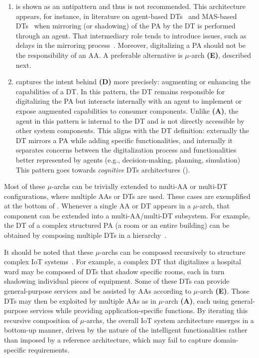 \begin{enumerate}[label=\textbf{(\Alph*)}]
    \item  is shown as an antipattern and thus is not recommended. 
    This architecture appears, for instance, in literature on agent-based DTs~\cite{Alelaimat_Ghose_Dam_2021,Stary_2021} and MAS-based DTs~\cite{Wan_David_Derigent_2021,Pretel_Zhinin-Vera_Navarro_López-Jaquero_González_2025} when mirroring (or shadowing) of the PA by the DT is performed through an agent. 
    That intermediary role tends to introduce issues, such as delays in the mirroring process~\cite{calvaresi2017challenge}. 
    Moreover, digitalizing a PA should not be the responsibility of an AA. 
    A preferable alternative is $\mu$-arch \textbf{(E)}, described next. 

    \item  captures the intent behind \textbf{(D)} more precisely: augmenting or enhancing the capabilities of a DT. 
    In this pattern, the DT remains responsible for digitalizing the PA but interacts internally with an agent to implement or expose augmented capabilities to consumer components. 
    Unlike \textbf{(A)}, the agent in this pattern is internal to the DT and is not directly accessible by other system components. 
    This aligns with the DT definition: externally the DT mirrors a PA while adding specific functionalities, and internally it separates concerns between the digitalization process and functionalities better represented by agents (e.g., decision-making, planning, simulation)
    This pattern goes towards \emph{cognitive} DTs architectures ().
\end{enumerate}

Most of these $\mu$-archs can be trivially extended to multi-AA or multi-DT configurations, where multiple AAs or DTs are used. 
These cases are exemplified at the bottom of . 
Whenever a single AA or DT appears in a $\mu$-arch, that component can be extended into a multi-AA/multi-DT subsystem. 
For example, the DT of a complex structured PA (a room or an entire building) can be obtained by composing multiple DTs in a hierarchy~\cite{Jia2022}.

It should be noted that these $\mu$-archs can be composed recursively to structure complex IoT systems~\cite{Wan_David_Derigent_2021}. 
For example, a complex DT that digitalizes a hospital ward may be composed of DTs that shadow specific rooms, each in turn shadowing individual pieces of equipment. 
Some of these DTs can provide general-purpose services and be assisted by AAs according to $\mu$-arch \textbf{(E)}. 
Those DTs may then be exploited by multiple AAs as in $\mu$-arch \textbf{(A)}, each using general-purpose services while providing application-specific functions. 
By iterating this recursive composition of $\mu$-archs, the overall IoT system architecture emerges in a bottom-up manner, driven by the nature of the intelligent functionalities rather than imposed by a reference architecture, which may fail to capture domain-specific requirements.

